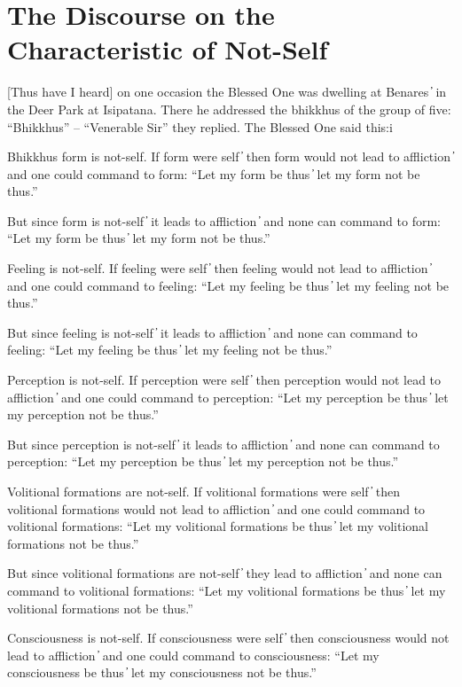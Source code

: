 \section{The Discourse on the Characteristic of Not-Self}

[Thus have I heard] on one occasion the Blessed One was dwelling at Benares  ̓  in the Deer Park at Isipatana. There he addressed the bhikkhus of the group of five: “Bhikkhus” – “Venerable Sir” they replied. The Blessed One said this:i

Bhikkhus form is not-self. If form were self  ̓  then form would not lead to affliction  ̓  and one could command to form: “Let my form be thus  ̓  let my form not be thus.”

But since form is not-self  ̓  it leads to affliction  ̓  and none can command to form: “Let my form be thus  ̓  let my form not be thus.”

Feeling is not-self. If feeling were self  ̓  then feeling would not lead to affliction  ̓  and one could command to feeling: “Let my feeling be thus  ̓  let my feeling not be thus.”

But since feeling is not-self  ̓  it leads to affliction  ̓  and none can command to feeling: “Let my feeling be thus  ̓  let my feeling not be thus.”

Perception is not-self. If perception were self  ̓  then perception would not lead to affliction  ̓  and one could command to perception: “Let my perception be thus  ̓  let my perception not be thus.”

But since perception is not-self  ̓  it leads to affliction  ̓  and none can command to perception: “Let my perception be thus  ̓  let my perception not be thus.”

Volitional formations are not-self. If volitional formations were self  ̓  then volitional formations would not lead to affliction  ̓  and one could command to volitional formations: “Let my volitional formations be thus  ̓  let my volitional formations not be thus.”

But since volitional formations are not-self  ̓  they lead to affliction  ̓  and none can command to volitional formations: “Let my volitional formations be thus  ̓  let my volitional formations not be thus.”

Consciousness is not-self. If consciousness were self  ̓  then consciousness would not lead to affliction  ̓  and one could command to consciousness: “Let my consciousness be thus  ̓  let my consciousness not be thus.”

